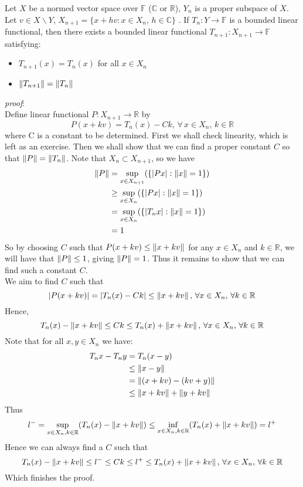 \begin{lemma}\label{ODEX}\rm\nextline
	Let $X$ be a normed vector space over $\mathbb F$ ($\mathbb{C}$ or $\mathbb{R}$), $Y_n$ is a proper subspace of $X$. Let $v\in X\backslash Y$, $X_{n+1}=\{x+hv:x\in X_n,\,h\in\mathbb{C}\}$
	. If $T_n:Y\xrightarrow{}\mathbb{F}$ is a bounded linear functional, then there exists a bounded linear functional $T_{n+1}:X_{n+1}\xrightarrow{}\mathbb{F}$ satisfying:
	\begin{itemize}
		\item $T_{n+1}(x)=T_n(x)$ for all $x\in X_n$
		\item $\left\|{T_{n+1}}\right\|=\left\|{T_n}\right\|$
	\end{itemize}
	\textit{proof}:\\
	Define linear functional $P:X_{n+1}\xrightarrow{}\mathbb{R}$ by
	$$
		P(x+kv)=T_n(x)-Ck,\,\forall\,x\in X_n,\,k\in\mathbb{R}
	$$
	where C is a constant to be determined.
	First we shall check linearity, which is left as an exercise.
	Then we shall show that we can find a proper constant $C$ so that $\left\|{P}\right\|=\left\|{T_n}\right\|$. Note that $X_n\subset X_{n+1}$, so we have
	\begin{equation}
		\begin{split}
			\left\|{P}\right\|&=\sup_{x\in X_{n+1}}(\{|Px|:\left\|{x}\right\|=1\})\\
			&\geq\sup_{x\in X_{n}}(\{|Px|:\left\|{x}\right\|=1\})\\
			&=\sup_{x\in X_{n}}(\{|T_nx|:\left\|{x}\right\|=1\})\\
			&=1
		\end{split}
	\end{equation}
	So by choosing $C$ such that $P(x+kv)\leq \left\|{x+kv}\right\|$ for any $x\in X_n$ and $k\in \mathbb{R}$, we will have that $\left\|{P}\right\|\leq 1$, giving $\left\|{P}\right\|=1$. Thus it remains to show that we can find such a constant $C$.\\
	We aim to find $C$ such that
	$$
		|P(x+kv)|=|T_n(x)-Ck|\leq \left\|{x+kv}\right\|,\,\forall x\in X_n,\,\forall k\in\mathbb{R}
	$$
	Hence,
	$$
		T_n(x)-\left\|{x+kv}\right\|\leq Ck\leq T_n(x)+\left\|{x+kv}\right\|,\,\forall x\in X_n,\,\forall k\in\mathbb{R}
	$$
	Note that for all $x,y\in X_n$ we have:
	\begin{equation}
		\begin{split}
			T_nx-T_ny&=T_n(x-y)\\
			&\leq \left\|{x-y}\right\|\\
			&=\left\|{(x+kv)-(kv+y)}\right\|\\
			&\leq\left\|{x+kv}\right\|+\left\|{y+kv}\right\|
		\end{split}
	\end{equation}
	Thus
	$$
		l^-=\sup_{x\in X_n,k\in\mathbb{R}}(T_n(x)-\left\|{x+kv}\right\|)\leq  \inf_{x\in X_n,k\in\mathbb{R}}(T_n(x)+\left\|{x+kv}\right\|)=l^+
	$$
	Hence we can always find a $C$ such that
	$$
		T_n(x)-\left\|{x+kv}\right\|\leq l^-\leq Ck\leq l^+ \leq T_n(x)+\left\|{x+kv}\right\|,\,\forall x\in X_n,\,\forall k\in\mathbb{R}
	$$
	Which finishes the proof.
\end{lemma}
